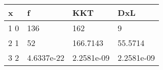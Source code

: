 \begin{tabular}{llll}
x & f & KKT & DxL \\ 
\hline 
1  0 & 136 & 162 & 9 \\ 
2           1 & 52 & 166.7143 & 55.5714 \\ 
3           2 & 4.6337e-22 & 2.2581e-09 & 2.2581e-09 \\ 
\hline 
\end{tabular}